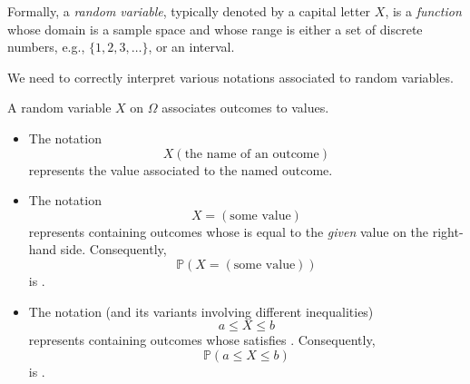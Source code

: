 \documentclass[../main.tex]{subfiles}
\begin{document}
Formally, a \emph{random variable}, typically denoted by a capital letter \(X\), is a \emph{function} whose domain is a sample space and whose range is either a set of discrete numbers, e.g., \(\{1,2,3,\ldots\}\), or an interval. 

We need to correctly interpret various notations associated to random variables.
\begin{definition} \label{def:random-variables}
  A random variable \(X\) on \(\Omega\) associates outcomes to values.

  \begin{itemize}[itemsep={2ex}, wide]
    \item The notation 
      \[
        X(\text{the name of an outcome})
      \] 
      represents the value associated to the named outcome.
      

    \item The notation 
      \[
        X = (\text{some value})
      \] 
      represents  containing outcomes whose  is equal to the \emph{given} value on the right-hand side. 
      Consequently, 
      \[
        \mathbb{P}(X = (\text{some value}))
      \]
      is .

    \item The notation (and its variants involving different inequalities)
      \[
        a \le X \le b
      \]
      represents  containing outcomes whose   satisfies . Consequently,
      \[
        \mathbb{P}(a \le X \le b)
      \]
      is .
  \end{itemize}
\end{definition}
\end{document}
